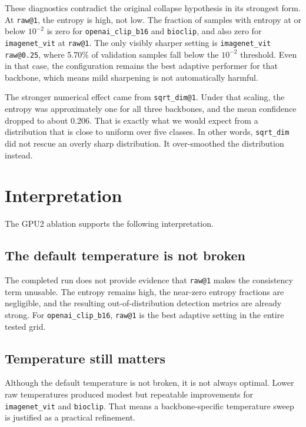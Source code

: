 \documentclass[11pt]{article}
\begin{document}
These diagnostics contradict the original collapse hypothesis in its strongest form. At \texttt{raw@1}, the entropy is high, not low. The fraction of samples with entropy at or below $10^{-2}$ is zero for \texttt{openai\_clip\_b16} and \texttt{bioclip}, and also zero for \texttt{imagenet\_vit} at \texttt{raw@1}. The only visibly sharper setting is \texttt{imagenet\_vit raw@0.25}, where 5.70\% of validation samples fall below the $10^{-2}$ threshold. Even in that case, the configuration remains the best adaptive performer for that backbone, which means mild sharpening is not automatically harmful.

The stronger numerical effect came from \texttt{sqrt\_dim@1}. Under that scaling, the entropy was approximately one for all three backbones, and the mean confidence dropped to about 0.206. That is exactly what we would expect from a distribution that is close to uniform over five classes. In other words, \texttt{sqrt\_dim} did not rescue an overly sharp distribution. It over-smoothed the distribution instead.

\section{Interpretation}

The GPU2 ablation supports the following interpretation.

\subsection{The default temperature is not broken}

The completed run does not provide evidence that \texttt{raw@1} makes the consistency term unusable. The entropy remains high, the near-zero entropy fractions are negligible, and the resulting out-of-distribution detection metrics are already strong. For \texttt{openai\_clip\_b16}, \texttt{raw@1} is the best adaptive setting in the entire tested grid.

\subsection{Temperature still matters}

Although the default temperature is not broken, it is not always optimal. Lower raw temperatures produced modest but repeatable improvements for \texttt{imagenet\_vit} and \texttt{bioclip}. That means a backbone-specific temperature sweep is justified as a practical refinement.
\end{document}
